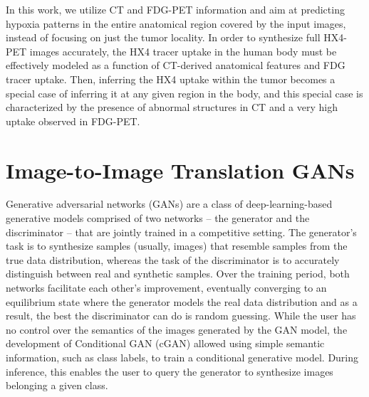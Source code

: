 In this work, we utilize CT and FDG-PET information and aim at predicting hypoxia patterns in the entire anatomical region covered by the input images, instead of focusing on just the tumor locality. In order to synthesize full HX4-PET images accurately, the HX4 tracer uptake in the human body must be effectively modeled as a function of CT-derived anatomical features and FDG tracer uptake. Then, inferring the HX4 uptake within the tumor becomes a special case of inferring it at any given region in the body, and this special case is characterized by the presence of abnormal structures in CT and a very high uptake observed in FDG-PET. 



\section{Image-to-Image Translation GANs}
Generative adversarial networks (GANs) \cite{goodfellow2014generative} are a class of deep-learning-based generative models comprised of two networks -- the generator and the discriminator -- that are jointly trained in a competitive setting. The generator's task is to synthesize samples (usually, images) that resemble samples from the true data distribution, whereas the task of the discriminator is to accurately distinguish between real and synthetic samples. Over the training period, both networks facilitate each other's improvement, eventually converging to an equilibrium state where the generator models the real data distribution and as a result, the best the discriminator can do is random guessing. While the user has no control over the semantics of the images generated by the GAN model, the development of Conditional GAN (cGAN) \cite{mirza2014conditional} allowed using simple semantic information, such as class labels, to train a conditional generative model. During inference, this enables the user to query the generator to synthesize images belonging a given class. 


